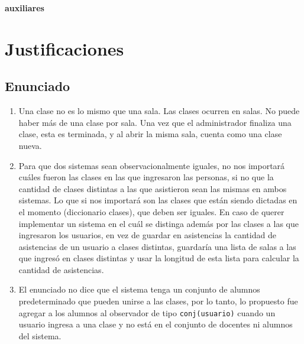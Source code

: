 \documentclass[10pt, a4paper]{article}
\begin{document}
\begin{tad}

\textbf{auxiliares}

\end{tad}

\section*{Justificaciones}
\subsection*{Enunciado}
\begin{enumerate}
\item Una clase no es lo mismo que una sala. Las clases ocurren en salas. No puede haber m\'as de una clase por sala. Una vez que el administrador finaliza una clase, esta es terminada, y al abrir la misma sala, cuenta como una clase nueva.
\item Para que dos sistemas sean observacionalmente iguales, no nos importar\'a cu\'ales fueron las clases en las que ingresaron las personas, si no que la cantidad de clases distintas a las que asistieron sean las mismas en ambos sistemas. Lo que si nos importar\'a son las clases que est\'an siendo dictadas en el momento (diccionario clases), que deben ser iguales. En caso de querer implementar un sistema en el cu\'al se distinga adem\'as por las clases a las que ingresaron los usuarios, en vez de guardar en asistencias la cantidad de asistencias de un usuario a clases distintas, guardar\'ia una lista de salas a las que ingres\'o en clases distintas y usar la longitud de esta lista para calcular la cantidad de asistencias.
\item El enunciado no dice que el sistema tenga un conjunto de alumnos predeterminado que pueden unirse a las clases, por lo tanto, lo propuesto fue agregar a los alumnos al observador de tipo \texttt{conj(usuario)} cuando un usuario ingresa a una clase y no est\'a en el conjunto de docentes ni alumnos del sistema.
\end{enumerate}
\end{document}
